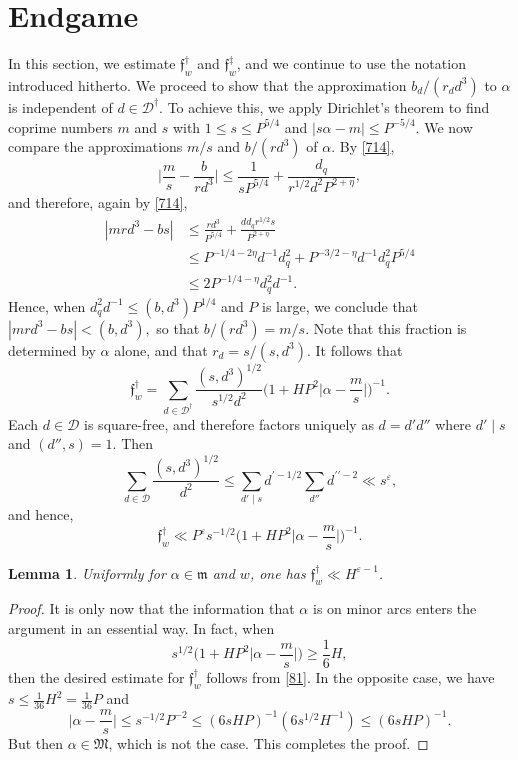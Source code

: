 \documentclass[reqno]{amsart}
\newcommand\eps{\varepsilon}
\newtheorem{lemma}[thm]{Lemma}
\numberwithin{equation}{section}
\begin{document}
\section{Endgame}
In this section, we estimate $\mathfrak f_w^\dagger$ and $\mathfrak f_w^\ddagger$, and we continue to use the notation introduced hitherto. We proceed to show that the approximation $b_d/(r_d d^3)$ to $\alpha$ is independent of $d \in \mathscr{D}^\dagger$. To achieve this, we apply Dirichlet's theorem to find coprime numbers $m$ and $s$ with $1 \leq s \leq P^{5/4}$ and 
$|s\alpha - m| \leq P^{-5/4}.$ 
We now compare the approximations $m/s$ and $b/(r d^3)$ of $\alpha$. By \eqref{714},
$$
\Big|\frac{m}{s} - \frac{b}{r d^3}\Big| \leq \frac{1}{s P^{5/4}} + \frac{d_q}{r^{1/2} d^2 P^{2+\eta}},
$$
and therefore, again by \eqref{714},
\begin{align*}
|mrd^3 - bs| &\leq \frac{r d^3}{P^{5/4}} + \frac{dd_q r^{1/2} s}{P^{2+\eta}} \\
&\leq P^{-1/4 - 2\eta} d^{-1} d_q^2 + P^{-3/2 - \eta}d^{-1} d_q^2 P^{5/4}
\\&\leq 2P^{-1/4 - \eta} d_q^2 d^{-1}.
\end{align*}
Hence, when $d_q^2 d^{-1}\leq (b,d^3)P^{1/4}$ and $P$ is large, we conclude that
$|mrd^3 - bs| < (b,d^3),$ 
so that $b/(rd^3) = m/s$. Note that this fraction is determined by $\alpha$ alone, and that $r_d = s/(s,d^3)$.
It follows that
$$
\mathfrak f_w^\dagger = \sum_{d \in \mathscr{D}^\dagger} \frac{(s,d^3)^{1/2}}{s^{1/2} d^2} \Big(1 + HP^2 \Big|\alpha - \frac{m}{s}\Big|\Big)^{-1}.
$$
Each $d \in \mathscr{D}$ is square-free, and therefore factors uniquely as $d = d' d''$ where $d' \mid s$ and $(d'', s) = 1$. Then
$$
\sum_{d \in \mathscr{D}} \frac{(s, d^3)^{1/2}}{d^2} \leq \sum_{d' \mid s} {d^{\prime-1/2}} \sum_{d''}d^{\prime\prime-2} \ll s^\eps,
$$
and hence,
\begin{equation}\label{81}
\mathfrak f_w^\dagger \ll P^\eps s^{-1/2} \Big(1 + HP^2 \Big|\alpha - \frac{m}{s}\Big|\Big)^{-1}. \end{equation}

\begin{lemma}\label{L81}
Uniformly for $\alpha \in \mathfrak m$ and $w$, one has $\mathfrak f_w^\dagger \ll H^{\eps - 1}$.
\end{lemma}

\begin{proof}
It is only now that the information that $\alpha$ is on minor arcs enters the argument in an essential way.  In fact, when 
$$s^{1/2} \Big(1 + HP^2 \Big|\alpha - \frac{m}{s}\Big|\Big) \ge \frac{1}{6} H,$$
then the desired estimate for $\mathfrak f_w^\dagger$ follows from \eqref{81}. In the opposite case, we have $s \leq \frac{1}{36} H^{2}=\frac{1}{36} P$ and
$$\Big|\alpha - \frac{m}{s}\Big| \leq s^{-1/2} P^{-2} \le (6s HP)^{-1}  (6s^{1/2} H^{-1})
\le  (6s HP)^{-1}.$$
But then $\alpha \in \mathfrak M$, which is not the case. This completes the proof.
\end{proof}
\end{document}
